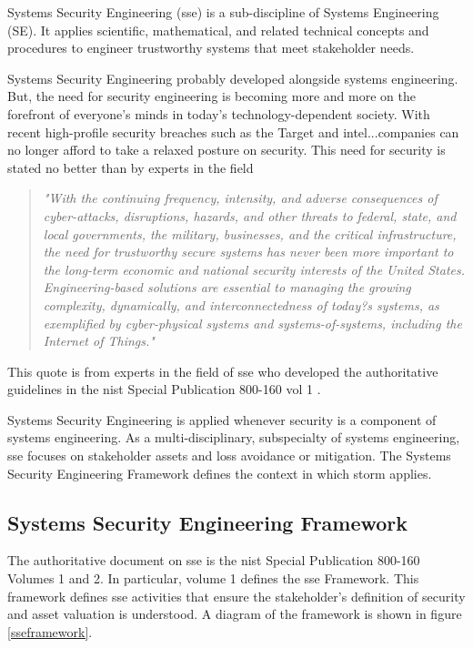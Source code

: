 \documentclass[../../main/main.tex]{subfiles}
\begin{document}
Systems Security Engineering (\gls{sse}) is a sub-discipline of Systems Engineering (SE).  It applies scientific, mathematical, and related technical concepts and procedures to engineer trustworthy systems that meet stakeholder needs. 

Systems Security Engineering probably developed alongside systems engineering.  But, the need for security engineering is becoming more and more on the forefront of everyone's minds in today's technology-dependent society.  With recent high-profile security breaches such as the Target and intel...companies can no longer afford to take a relaxed posture on security.  This need for security is stated no better than by experts in the field

\begin{quote}
\textit{"With the continuing frequency, intensity, and adverse consequences of cyber-attacks, disruptions, hazards, and other threats to federal, state, and local governments, the military, businesses, and the critical infrastructure, the need for trustworthy secure systems has never been more important to the long-term economic and national security interests of the United States. Engineering-based solutions are essential to managing the growing complexity, dynamically, and interconnectedness of today?s systems, as exemplified by cyber-physical systems and systems-of-systems, including the Internet of Things."}  \cite{NIST800160}
\end{quote}
 This quote is from experts in the field of \gls{sse} who developed the authoritative guidelines in the \gls{nist} Special Publication 800-160 vol 1 \cite{NIST800160}.  



Systems Security Engineering is applied whenever security is a component of systems engineering.  As a multi-disciplinary, subspecialty of systems engineering, \gls{sse} focuses on stakeholder assets and loss avoidance or mitigation.  The Systems Security Engineering Framework defines the context in which \gls{storm} applies.
   

\subsection{Systems Security Engineering Framework}
The authoritative document on \gls{sse} is the \gls{nist} Special Publication 800-160 Volumes 1 and 2.  In particular, volume 1 defines the \gls{sse} Framework.  This framework defines \gls{sse} activities that ensure the stakeholder's definition of security and asset valuation is understood.  A diagram of the framework is shown in figure \ref{sseframework}.
\end{document}

